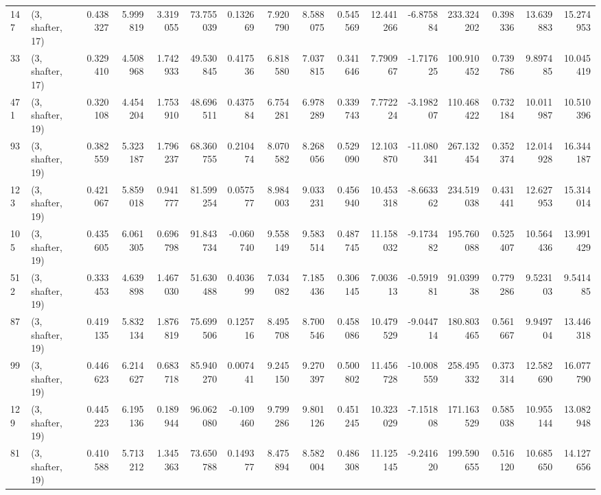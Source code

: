 \begin{tabular}{llrrrrrrrrrrrrrr}
147 &  (3, shafter, 17) &   0.438327 &   5.999819 &   3.319055 &    73.755039 &   0.132669 &   7.920790 &   8.588075 &  0.545569 &  12.441266 &  -6.875884 &   233.324202 &  0.398336 &  13.639883 &  15.274953 \\
33  &  (3, shafter, 17) &   0.329410 &   4.508968 &   1.742933 &    49.530845 &   0.417536 &   6.818580 &   7.037815 &  0.341646 &   7.790967 &  -1.717625 &   100.910452 &  0.739786 &   9.897485 &  10.045419 \\
471 &  (3, shafter, 19) &   0.320108 &   4.454204 &   1.753910 &    48.696511 &   0.437584 &   6.754281 &   6.978289 &  0.339743 &   7.772224 &  -3.198207 &   110.468422 &  0.732184 &  10.011987 &  10.510396 \\
93  &  (3, shafter, 19) &   0.382559 &   5.323187 &   1.796237 &    68.360755 &   0.210474 &   8.070582 &   8.268056 &  0.529090 &  12.103870 & -11.080341 &   267.132454 &  0.352374 &  12.014928 &  16.344187 \\
123 &  (3, shafter, 19) &   0.421067 &   5.859018 &   0.941777 &    81.599254 &   0.057577 &   8.984003 &   9.033231 &  0.456940 &  10.453318 &  -8.663362 &   234.519038 &  0.431441 &  12.627953 &  15.314014 \\
105 &  (3, shafter, 19) &   0.435605 &   6.061305 &   0.696798 &    91.843734 &  -0.060740 &   9.558149 &   9.583514 &  0.487745 &  11.158032 &  -9.173482 &   195.760088 &  0.525407 &  10.564436 &  13.991429 \\
512 &  (3, shafter, 19) &   0.333453 &   4.639898 &   1.467030 &    51.630488 &   0.403699 &   7.034082 &   7.185436 &  0.306145 &   7.003613 &  -0.591981 &    91.039938 &  0.779286 &   9.523103 &   9.541485 \\
87  &  (3, shafter, 19) &   0.419135 &   5.832134 &   1.876819 &    75.699506 &   0.125716 &   8.495708 &   8.700546 &  0.458086 &  10.479529 &  -9.044714 &   180.803465 &  0.561667 &   9.949704 &  13.446318 \\
99  &  (3, shafter, 19) &   0.446623 &   6.214627 &   0.683718 &    85.940270 &   0.007441 &   9.245150 &   9.270397 &  0.500802 &  11.456728 & -10.008559 &   258.495332 &  0.373314 &  12.582690 &  16.077790 \\
129 &  (3, shafter, 19) &   0.445223 &   6.195136 &   0.189944 &    96.062080 &  -0.109460 &   9.799286 &   9.801126 &  0.451245 &  10.323029 &  -7.151808 &   171.163529 &  0.585038 &  10.955144 &  13.082948 \\
81  &  (3, shafter, 19) &   0.410588 &   5.713212 &   1.345363 &    73.650788 &   0.149377 &   8.475894 &   8.582004 &  0.486308 &  11.125145 &  -9.241620 &   199.590655 &  0.516120 &  10.685650 &  14.127656 \\

\end{tabular}

